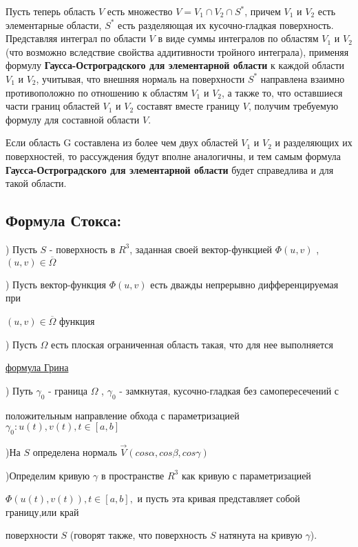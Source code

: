 \documentclass[12pt]{article}
\begin{document}
	Пусть теперь область $V$ есть множество $V = V_1 \cap V_2 \cap S^* $, причем $V_1$
и $V_2$ есть элементарные области, $S^* $ есть разделяющая их кусочно-гладкая
поверхность. Представляя интеграл по области $V$ в виде суммы интегралов по областям $V_1$ и $V_2$ (что возможно вследствие свойства аддитивности
тройного интеграла), применяя формулу \textbf{Гаусса-Остроградского для элементарной области} к каждой области $V_1$ и $V_2$,
учитывая, что внешняя нормаль на поверхности $S^* $ направлена взаимно
противоположно по отношению к областям $V_1$ и $V_2$, а также то, что оставшиеся части границ областей $V_1$ и $V_2$ составят вместе границу $V$, получим
требуемую формулу  для составной области $V$.

	Если область G составлена из более чем двух областей
$V_1$ и $V_2$ и разделяющих их поверхностей, то рассуждения будут вполне
аналогичны, и тем самым формула \textbf{Гаусса-Остроградского для элементарной области} будет справедлива и для такой
области.


\newpage
\subsection{Формула Стокса:}

) Пусть $S$ - поверхность в $R^3$, заданная своей вектор-функцией $\Phi(u,v)$ , $(u,v) \in \overline{\Omega}$

) Пусть вектор-функция $\Phi(u,v)$ есть дважды непрерывно дифференцируемая при \par $(u,v) \in \overline{\Omega}$ функция
	
) Пусть $\Omega$ есть плоская ограниченная область такая, что для нее выполняется \par \hyperref[eq3]{формула Грина}

) Путь $\gamma_0$ - граница $\Omega$ , $\gamma_0$ - замкнутая, кусочно-гладкая без самопересечений с \par положительным направление обхода с параметризацией  $\gamma_0 : u(t) , v(t) , t \in [a,b]$

)На $S$ определена нормаль $\vec{V}(cos\alpha , cos\beta , cos\gamma)$

)Определим кривую $\gamma$ в пространстве $R^3$ как кривую с параметризацией \par $\Phi(u(t) , v(t)) , t \in [a,b], $ и пусть эта кривая представляет собой границу,или край \par поверхности $S$ (говорят также, что поверхность $S$ натянута
на кривую $\gamma$).
\end{document}
